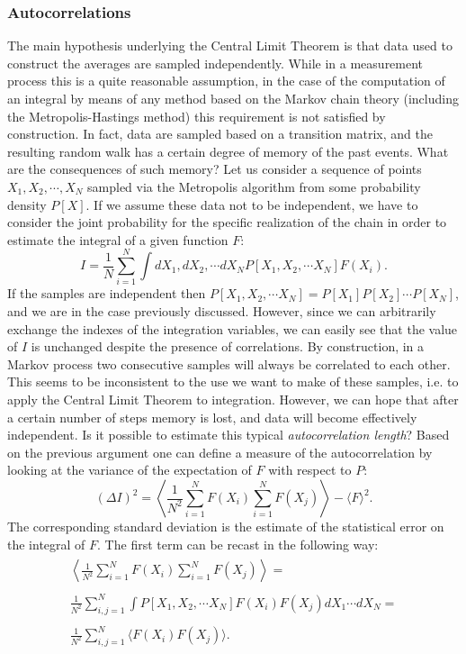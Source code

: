   \subsubsection{Autocorrelations}
  The main hypothesis underlying the Central Limit Theorem is that data used to construct the averages are sampled independently. While in a measurement process this is a quite reasonable assumption, in the case of the computation of an integral by means of any method based on the Markov chain theory (including the Metropolis-Hastings method) this requirement is not satisfied by construction. In fact, data are sampled based on a transition matrix, and the resulting random walk has a certain degree of memory of the past events. What are the consequences of such memory? Let us consider a sequence of points $X_1,X_2,\cdots,X_N$ sampled via the Metropolis algorithm from some probability density $P[X]$. If we assume these data not to be independent, we have to consider the joint probability for the specific realization of the chain in order to estimate the integral of a given function $F$:
  \begin{equation}
  I = \frac{1}{N}\sum_{i=1}^{N}\int dX_1,dX_2,\cdots dX_N P[X_1,X_2,\cdots X_N]F(X_i).
  \end{equation}  
  If the samples are independent then $P[X_1,X_2,\cdots X_N]=P[X_1]P[X_2]\cdots P[X_N]$, and we are in the case previously discussed. However, since we can arbitrarily exchange the indexes of the integration variables, we can easily see that the value of $I$ is unchanged despite the presence of correlations.
  By construction,  in a Markov process two consecutive samples will always be correlated to each other. This seems to be inconsistent to the use we want to make of these samples, i.e. to apply the Central Limit Theorem to integration. However, we can hope that after a certain number of steps memory is lost, and data will become effectively independent.
  Is it possible to estimate this typical {\it autocorrelation length}?
  Based on the previous argument one can define a measure of the autocorrelation by looking at the variance of the expectation of $F$ with respect to $P$: 
  \begin{equation}
   (\Delta I)^2=\left \langle \displaystyle\frac{1}{N^2}\sum_{i=1}^N F(X_i)\sum_{i=1}^N F(X_j)\right \rangle-\langle F\rangle^2.
  \end{equation}
  The corresponding standard deviation  is the estimate of the statistical error on the integral of $F$. The first term can be recast in the following way:
  \begin{eqnarray}
  \begin{array}{c}
\left  \langle \displaystyle\frac{1}{N^2}\sum_{i=1}^N F(X_i)\sum_{i=1}^N F(X_j)\right \rangle=\\ \\
  \displaystyle \frac{1}{N^2}\sum_{i,j=1}^N\int P[X_1,X_2,\cdots X_N]F(X_i)F(X_j)dX_1\cdots dX_N=\\ \\
  \displaystyle \frac{1}{N^2}\sum_{i,j=1}^N \langle F(X_i)F(X_j)\rangle.
  \end{array}
  \end{eqnarray}
